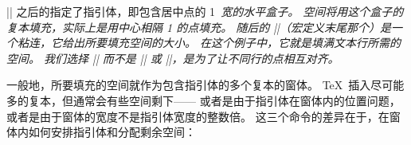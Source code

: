 {%
|\leaders| 之后的指定了指引体，即包含居中点的 1\em\ 宽的水平盒子。
空间将用这个盒子的复本填充，实际上是用中心相隔 1\em{} 的点填充。
随后的 |\hfil|（宏定义末尾那个）是一个粘连，它给出所要填充空间的大小。
在这个例子中，它就是填满文本行所需的空间。
我们选择 |\leaders| 而不是 |\cleaders| 或 |\xleaders|，是为了让不同行的点相互对齐。

一般地，所要填充的空间就作为包含指引体的多个复本的窗体。
\TeX\ 插入尽可能多的复本，但通常会有些空间剩下——%
或者是由于指引体在窗体内的位置问题，或者是由于窗体的宽度不是指引体宽度的整数倍。
这三个命令的差异在于，在窗体内如何安排指引体和分配剩余空间：

}
